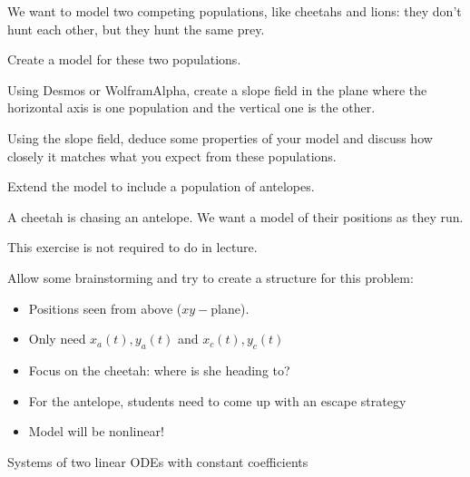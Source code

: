 \newpage

\question We want to model two competing populations, like cheetahs and lions: they don't hunt each other, but they hunt the same prey.
\begin{parts}
	\item Create a model for these two populations.
	\item Using Desmos or WolframAlpha, create a slope field in the plane where the horizontal axis is one population and the vertical one is the other.
	\item Using the slope field, deduce some properties of your model and discuss how closely it matches what you expect from these populations.

	\item Extend the model to include a population of antelopes.	
\end{parts}





\bookonlynewpage


\question
	A cheetah is chasing an antelope. We want a model of their positions as they run.
	
	
\begin{annotation}
	\begin{goals}
		This exercise is not required to do in lecture.
		
		Allow some brainstorming and try to create a structure for this problem:
		\begin{itemize}
			\item Positions seen from above ($xy-$plane).
			\item Only need $x_a(t), y_a(t)$ and $x_c(t), y_c(t)$
			\item Focus on the cheetah: where is she heading to?
			\item For the antelope, students need to come up with an escape strategy
			\item Model will be nonlinear!
		\end{itemize}
	\end{goals}
\end{annotation}





%
%



\begin{module}{Systems of two linear ODEs with constant coefficients}
	\label{sys:solve}

	
	
\end{module}



